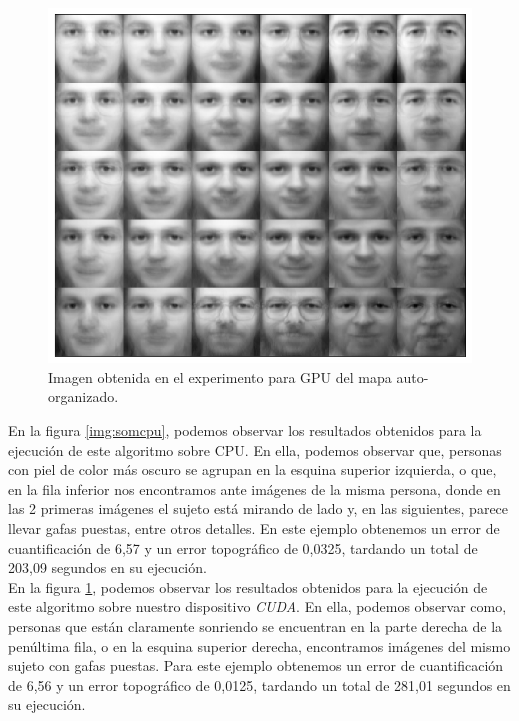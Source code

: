 \begin{figure}[ht]
\centering
\includegraphics[scale=0.3]{imagenes/facesgpu.png}
\caption{Imagen obtenida en el experimento para GPU del mapa auto-organizado.}
\label{img:somgpu}
\end{figure}

En la figura \ref{img:somcpu}, podemos observar los resultados obtenidos para la ejecución de este algoritmo sobre CPU. En ella, podemos observar que, personas con piel de color más oscuro se agrupan en la esquina superior izquierda, o que, en la fila inferior nos encontramos ante imágenes de la misma persona, donde en las 2 primeras imágenes el sujeto está mirando de lado y, en las siguientes, parece llevar gafas puestas, entre otros detalles. En este ejemplo obtenemos un error de cuantificación de 6,57 y un error topográfico de 0,0325, tardando un total de 203,09 segundos en su ejecución.\\

En la figura \ref{img:somgpu}, podemos observar los resultados obtenidos para la ejecución de este algoritmo sobre nuestro dispositivo \textit{CUDA}. En ella, podemos observar como, personas que están claramente sonriendo se encuentran en la parte derecha de la penúltima fila, o en la esquina superior derecha, encontramos imágenes del mismo sujeto con gafas puestas. Para este ejemplo obtenemos un error de cuantificación de 6,56 y un error topográfico de 0,0125, tardando un total de 281,01 segundos en su ejecución.\\
	

